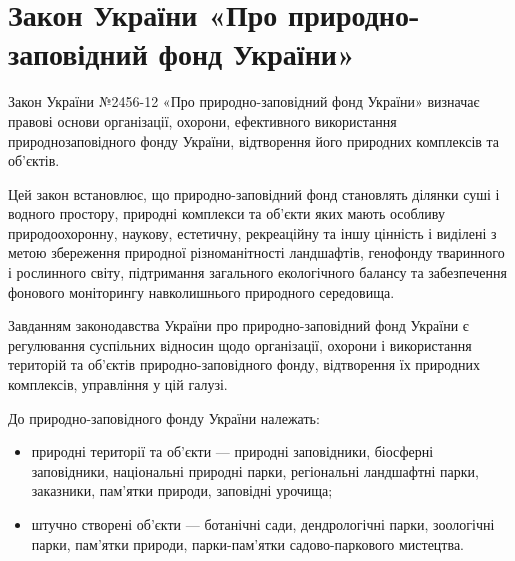 \documentclass[a4paper,oneside,DIV=10,12pt]{scrreprt}
\begin{document}
		\section{Закон України «Про природно-заповідний фонд України»}
			Закон України №2456-12 «Про природно-заповідний фонд України» визначає правові основи організації, охорони, ефективного використання при\-род\-но\-за\-по\-від\-но\-го фонду України, відтворення його природних комплексів та об'єктів.
			
			Цей закон встановлює, що природно-заповідний фонд становлять ділянки суші і водного простору, природні комплекси та об'єкти яких мають особливу природоохоронну, наукову, естетичну, рекреаційну та іншу цінність і виділені з метою збереження природної різноманітності ландшафтів, генофонду тваринного і рослинного світу, підтримання загального екологічного балансу та забезпечення фонового моніторингу навколишнього природного середовища.
			
			Завданням законодавства України про природно-заповідний фонд України є регулювання суспільних відносин щодо організації, охорони і використання територій та об'єктів природно-заповідного фонду, відтворення їх природних комплексів, управління у цій галузі.
			
			До природно-заповідного фонду України належать:
			\begin{itemize}
				\item природні території та об'\-єк\-ти --- природні заповідники, біосферні заповідники, національні природні парки, регіональні ландшафтні парки, заказники, пам'\-ят\-ки природи, заповідні урочища;
				\item штучно створені об'\-єк\-ти --- ботанічні сади, дендрологічні парки, зоологічні парки, пам\-'ят\-ки природи, парки-пам'\-ят\-ки садово-паркового мистецтва.
			\end{itemize}
			
\end{document}
